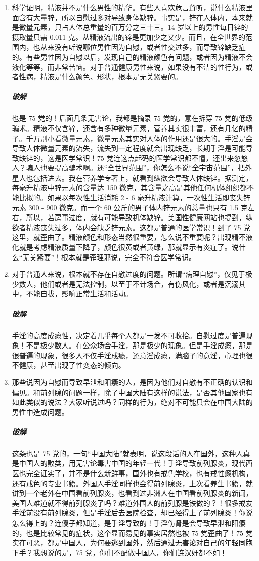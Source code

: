 \begin{enumerate}
    \item 科学证明，精液并不是什么男性的精华。有些人喜欢危言耸听，说什么精液里面含有大量锌，所以自慰过多对导致身体缺锌。事实是，锌在人体内，本来就是微量元素，只占人体总重量的百万分之三十三。14 岁以上的男性每日锌的摄取量只需 0.011 克。从精液流出的锌是更加少之又少。而且，在全世界的范围内，也从来没有听说哪位男性因为自慰，或者性交过多，而导致锌缺乏症的。有些男性因为自慰以后，发现自己的精液颜色有问题，或者因为精液不会液化等等，而非常苦恼。对于普通健康男性来说，如果没有不洁的性行为，或者性病，精液是什么颜色、形状，根本是无关紧要的。
    \subparagraph{破解} 也是 75 党的！后面几条无害论，我都是摘录 75 党的，意在拆穿 75 党的低级骗术。精液不仅含锌，还含有多种微量元素，营养其实很丰富，还有几亿的精子。千万别小看微量元素，微量元素其实对人体的作用还是很大的。手淫是会导致人体微量元素的流失，流失到一定程度就会出现缺乏，长期手淫是可能导致缺锌的，这是医学常识！75 党连这点起码的医学常识都不懂，还出来忽悠人？骗人也要提高骗术啊。还“全世界范围”，你怎么不说“全宇宙范围”，把外星人也包括进去。我在营养学专著上，就看到纵欲会导致人体缺锌。据测定，每毫升精液中锌元素的含量达 150 微克，其含量之高是其他任何机体组织都不能比拟的。如果以每次性生活消耗 2 - 6 毫升精液计算，一次性生活即丧失锌元素 300 - 900 微克。而一个 60 公斤的男子体内锌元素的总量也只有 1.5 克左右，所以，若房事过度，就有可能导致机体缺锌。美国性健康网站也提到，纵欲者精液丧失过多，体内会缺乏锌元素。这都是普通的医学常识！到了 75 党这里，就歪曲了。精液颜色和形态当然很重要，怎么说不重要呢？出现精不液化就是考虑精液质量下降了，颜色很黄或者黄绿，那就显示有炎症了。说什么“无关紧要”！根本就是歪理邪说，完全不符合医学常识。
    \item 对于普通人来说，根本就不存在自慰过度的问题。所谓“病理自慰”，仅见于极少数人，他们或者是无法控制，以至于不计场合，有伤风化，或者是沉溺其中，不能自拔，影响正常生活和活动。
    \subparagraph{破解} 手淫的高度成瘾性，决定着几乎每个人都是一发不可收拾。自慰过度是普遍现象！不是极少数人。在公众场合手淫，那是极少的现象。但是手淫成瘾，那是很普遍的现象，很多人不仅手淫成瘾，还意淫成瘾，满脑子的意淫，心理也很不健康，甚至出现了性变态的倾向。
    \item 那些说因为自慰而导致早泄和阳痿的人，是因为他们对自慰有不正确的认识和偏见。和前列腺的问题一样，除了中国大陆有这样的说法，是否其他国家也有如此类似的说法？大家听说过吗？同样的行为，绝对不可能只会在中国大陆的男性中造成问题。
    \subparagraph{破解} 这条也是 75 党的，一句“中国大陆”就表明，说这段话的人在国外，这种人真是中国人的败类，用无害论毒害中国的年轻一代！手淫导致前列腺炎，现代西医也完全证实了，并不是什么新鲜事，国外也有戒色学校，也有戒性瘾机构，还有戒色的专业书籍。外国人手淫同样也会得前列腺炎，上次看养生书籍，就讲到一个老外在中国看前列腺炎，也看到过非洲人在中国看前列腺炎的新闻，美国人难道就不得前列腺炎了吗？难道外国人的前列腺是铁做的？！很多戒友手淫前没有前列腺炎，但是手淫后去医院检查，却已经得上了前列腺炎！你说怎么得上的？连傻子都知道，是手淫导致的！手淫伤肾是会导致早泄和阳痿的，也是比较常见的症状，这个显而易见的事实居然也被 75 党歪曲了！75 党实在可恶，都是中国人，为何要逃到国外，然后通过无害论对自己的年轻同胞下手？我想说的是，75 党，你们不配做中国人，你们连汉奸都不如！
\end{enumerate}


